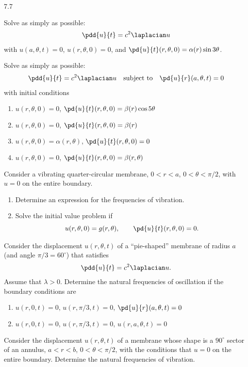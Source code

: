 \begin{exercises}{7.7}

\item[\starred] Solve as simply as possible:
\[
\pdd{u}{t} = c^2\laplacian u
\]
with $u(a,\theta,t) = 0$, $u(r,\theta,0) = 0$, and $\pd{u}{t}(r,\theta,0) = \alpha(r)\sin 3\theta$.

\item Solve as simply as possible:
\[
\pdd{u}{t} = c^2\laplacian u \quad\text{subject to}\quad \pd{u}{r}(a,\theta,t) = 0
\]
with initial conditions
\begin{enumerate}
\item[(a)] $u(r,\theta,0) = 0$, \quad $\pd{u}{t}(r,\theta,0) = \beta(r)\cos 5\theta$
\item[(b)] $u(r,\theta,0) = 0$, \quad $\pd{u}{t}(r,\theta,0) = \beta(r)$
\item[(c)] $u(r,\theta,0) = \alpha(r,\theta)$, \quad $\pd{u}{t}(r,\theta,0) = 0$
\item[\starred(d)] $u(r,\theta,0) = 0$, \quad $\pd{u}{t}(r,\theta,0) = \beta(r,\theta)$
\end{enumerate}

\item Consider a vibrating quarter-circular membrane, $0 < r < a$, $0 < \theta < \pi/2$, with $u = 0$ on the entire boundary.

\begin{enumerate}
\item[\starred(a)] Determine an expression for the frequencies of vibration.
\item[(b)] Solve the initial value problem if
\[
u(r,\theta,0) = g(r,\theta), \qquad \pd{u}{t}(r,\theta,0) = 0.
\]
\end{enumerate}

\item Consider the displacement $u(r,\theta,t)$ of a ``pie-shaped'' membrane of radius $a$ (and angle $\pi/3 = 60^\circ$) that satisfies
\[
\pdd{u}{t} = c^2\laplacian u.
\]
Assume that $\lambda > 0$.  Determine the natural frequencies of oscillation if the boundary conditions are
\begin{enumerate}
\item[(a)] $u(r,0,t) = 0$, \quad $u(r,\pi/3,t) = 0$, \quad $\pd{u}{r}(a,\theta,t) = 0$
\item[(b)] $u(r,0,t) = 0$, \quad $u(r,\pi/3,t) = 0$, \quad $u(r,a,\theta,t) = 0$
\end{enumerate}

\item[\starred] Consider the displacement $u(r,\theta,t)$ of a membrane whose shape is a $90^\circ$ sector of an annulus, $a < r < b$, $0 < \theta < \pi/2$, with the conditions that $u = 0$ on the entire boundary.  Determine the natural frequencies of vibration.


\end{exercises}
